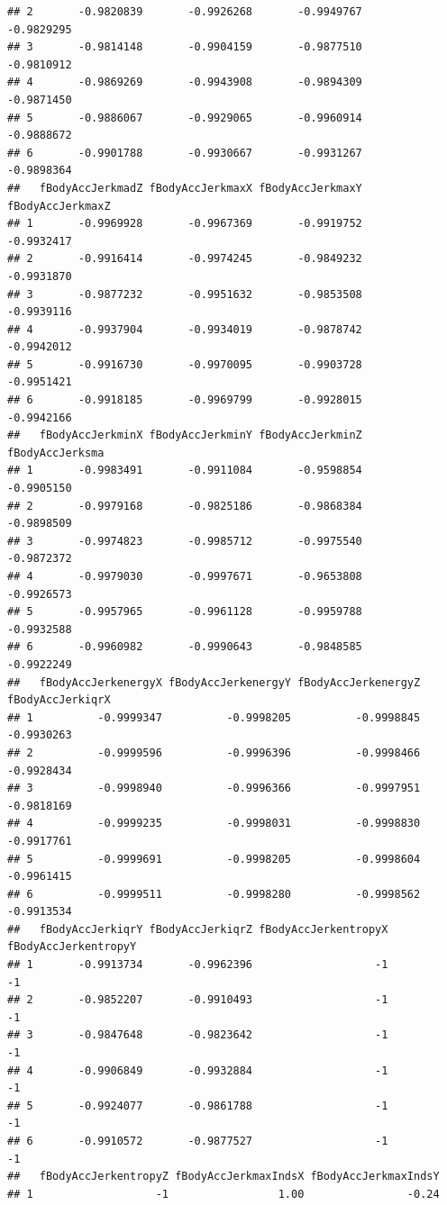\documentclass[
]{article}
\begin{document}
\begin{verbatim}
## 2       -0.9820839       -0.9926268       -0.9949767       -0.9829295
## 3       -0.9814148       -0.9904159       -0.9877510       -0.9810912
## 4       -0.9869269       -0.9943908       -0.9894309       -0.9871450
## 5       -0.9886067       -0.9929065       -0.9960914       -0.9888672
## 6       -0.9901788       -0.9930667       -0.9931267       -0.9898364
##   fBodyAccJerkmadZ fBodyAccJerkmaxX fBodyAccJerkmaxY fBodyAccJerkmaxZ
## 1       -0.9969928       -0.9967369       -0.9919752       -0.9932417
## 2       -0.9916414       -0.9974245       -0.9849232       -0.9931870
## 3       -0.9877232       -0.9951632       -0.9853508       -0.9939116
## 4       -0.9937904       -0.9934019       -0.9878742       -0.9942012
## 5       -0.9916730       -0.9970095       -0.9903728       -0.9951421
## 6       -0.9918185       -0.9969799       -0.9928015       -0.9942166
##   fBodyAccJerkminX fBodyAccJerkminY fBodyAccJerkminZ fBodyAccJerksma
## 1       -0.9983491       -0.9911084       -0.9598854      -0.9905150
## 2       -0.9979168       -0.9825186       -0.9868384      -0.9898509
## 3       -0.9974823       -0.9985712       -0.9975540      -0.9872372
## 4       -0.9979030       -0.9997671       -0.9653808      -0.9926573
## 5       -0.9957965       -0.9961128       -0.9959788      -0.9932588
## 6       -0.9960982       -0.9990643       -0.9848585      -0.9922249
##   fBodyAccJerkenergyX fBodyAccJerkenergyY fBodyAccJerkenergyZ fBodyAccJerkiqrX
## 1          -0.9999347          -0.9998205          -0.9998845       -0.9930263
## 2          -0.9999596          -0.9996396          -0.9998466       -0.9928434
## 3          -0.9998940          -0.9996366          -0.9997951       -0.9818169
## 4          -0.9999235          -0.9998031          -0.9998830       -0.9917761
## 5          -0.9999691          -0.9998205          -0.9998604       -0.9961415
## 6          -0.9999511          -0.9998280          -0.9998562       -0.9913534
##   fBodyAccJerkiqrY fBodyAccJerkiqrZ fBodyAccJerkentropyX fBodyAccJerkentropyY
## 1       -0.9913734       -0.9962396                   -1                   -1
## 2       -0.9852207       -0.9910493                   -1                   -1
## 3       -0.9847648       -0.9823642                   -1                   -1
## 4       -0.9906849       -0.9932884                   -1                   -1
## 5       -0.9924077       -0.9861788                   -1                   -1
## 6       -0.9910572       -0.9877527                   -1                   -1
##   fBodyAccJerkentropyZ fBodyAccJerkmaxIndsX fBodyAccJerkmaxIndsY
## 1                   -1                 1.00                -0.24

\end{verbatim}
\end{document}
